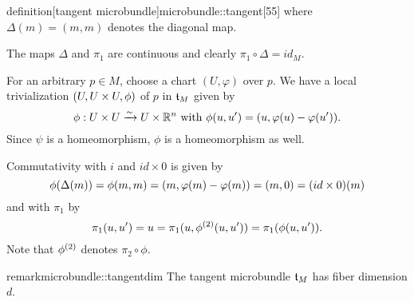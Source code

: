 
\begin{mystatement}{definition}[tangent
microbundle]{microbundle::tangent}[55]
where $\Delta(m) = (m, m)$ denotes the diagonal map.
\end{mystatement}

\begin{myproof}
The maps $\Delta$ and $\pi_1$ are continuous and clearly $\pi_1 \circ \Delta = id_M$.

For an arbitrary $p \in M$,
choose a chart $(U, \varphi)$ over $p$.
We have a local trivialization $(U, U \times U, \phi)$ of $p$ in $\mathfrak{t}_M$ given by
\[ \phi: U \times U \xrightarrow{\sim} U \times \mathbb{R}^n \text{ with } \phi(u, u') = (u, \varphi(u) - \varphi(u')). \]
Since $\psi$ is a homeomorphism, $\phi$ is a homeomorphism as well.

Commutativity with $i$ and $id \times 0$ is given by
\[ \phi(\Delta(m)) = \phi(m, m) = (m, \varphi(m) - \varphi(m)) = (m, 0) = (id \times 0)(m)\]
and with $\pi_1$ by
\[ \pi_1(u, u') = u = \pi_1(u, \phi^{(2)}(u, u')) = \pi_1(\phi(u, u')). \]
Note that $\phi^{(2)}$ denotes $\pi_2 \circ \phi$.
\end{myproof}

\begin{mystatement}{remark}{microbundle::tangentdim}
The tangent microbundle $\mathfrak{t}_M$ has fiber dimension $d$.
\end{mystatement}